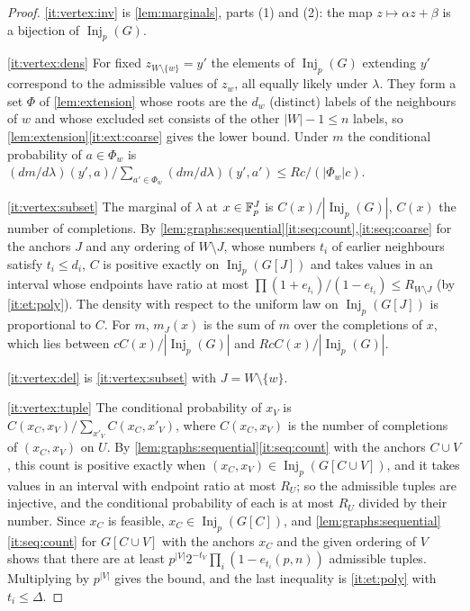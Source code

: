 \begin{proof}
\ref{it:vertex:inv} is \cref{lem:marginals}, parts (1) and (2): the map
$z\mapsto\alpha z+\beta$ is a bijection of $\operatorname{Inj}_p(G)$.

\ref{it:vertex:dens} For fixed $z_{W\setminus\{w\}}=y'$ the elements of
$\operatorname{Inj}_p(G)$ extending $y'$ correspond to the admissible values of
$z_w$, all equally likely under $\lambda$. They form a set $\Phi$ of
\cref{lem:extension} whose roots are the $d_w$ (distinct) labels of the
neighbours of $w$ and whose excluded set consists of the other $|W|-1\le n$
labels, so \cref{lem:extension}\ref{it:ext:coarse} gives the lower bound. Under
$m$ the conditional probability of $a\in\Phi_w$ is
$(dm/d\lambda)(y',a)/\sum_{a'\in\Phi_w}(dm/d\lambda)(y',a')\le Rc/(|\Phi_w|c)$.

\ref{it:vertex:subset} The marginal of $\lambda$ at $x\in\mathbb F_p^J$ is
$C(x)/|\operatorname{Inj}_p(G)|$, $C(x)$ the number of completions. By
\cref{lem:graphs:sequential}\ref{it:seq:count},\ref{it:seq:coarse} for the anchors
$J$ and any ordering of $W\setminus J$, whose numbers $t_i$ of earlier neighbours
satisfy $t_i\le d_i$, $C$ is positive exactly on $\operatorname{Inj}_p(G[J])$ and
takes values in an interval whose endpoints have ratio at most
$\prod(1+e_{t_i})/(1-e_{t_i})\le R_{W\setminus J}$ (by \ref{it:et:poly}). The density with
respect to the uniform law on $\operatorname{Inj}_p(G[J])$ is proportional to $C$.
For $m$, $m_J(x)$ is the sum of $m$ over the completions of $x$, which lies
between $cC(x)/|\operatorname{Inj}_p(G)|$ and $RcC(x)/|\operatorname{Inj}_p(G)|$.

\ref{it:vertex:del} is \ref{it:vertex:subset} with $J=W\setminus\{w\}$.

\ref{it:vertex:tuple} The conditional probability of $x_V$ is
$C(x_C,x_V)/\sum_{x'_V}C(x_C,x'_V)$, where $C(x_C,x_V)$ is the number of completions
of $(x_C,x_V)$ on $U$. By \cref{lem:graphs:sequential}\ref{it:seq:count} with the
anchors $C\cup V$, this count is positive exactly when
$(x_C,x_V)\in\operatorname{Inj}_p(G[C\cup V])$, and it takes values in an interval
with endpoint ratio at most $R_U$; so the admissible tuples are injective, and
the conditional probability of each is at most $R_U$ divided by their number.
Since $x_C$ is feasible, $x_C\in\operatorname{Inj}_p(G[C])$, and
\cref{lem:graphs:sequential}\ref{it:seq:count} for $G[C\cup V]$ with the anchors $x_C$
and the given ordering of $V$ shows that there are at least
$p^{|V|}2^{-t_V}\prod_i(1-e_{t_i}(p,n))$ admissible tuples. Multiplying by
$p^{|V|}$ gives the bound, and the last inequality is \ref{it:et:poly} with
$t_i\le\Delta$.
\end{proof}

